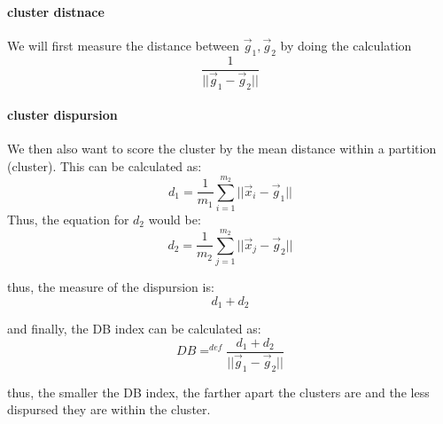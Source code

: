 \documentclass[12pt]{book}
\begin{document}
\paragraph{cluster distnace}
We will first measure the distance between $\vec g_1, \vec g_2$ by doing
the calculation
\[\frac{1}{||\vec g_1 - \vec g_2||}\]

\paragraph{cluster dispursion}
We then also want to score the cluster by the mean distance within a partition 
(cluster). This can be calculated as:
\[d_1 = \frac{1}{m_1}\sum^{m_2}_{i=1}||\vec x_i - \vec g_1||\]
Thus, the equation for $d_2$ would be:
\[d_2 = \frac{1}{m_2}\sum^{m_2}_{j=1}||\vec x_j - \vec g_2||\]

thus, the measure of the dispursion is:
\[d_1 + d_2\]

and finally, the DB index can be calculated as:
\[DB =^{def} \frac{d_1 + d_2}{||\vec g_1 - \vec g_2||}\]

thus, the smaller the DB index, the farther apart the clusters are and the less
dispursed they are within the cluster.
\end{document}
